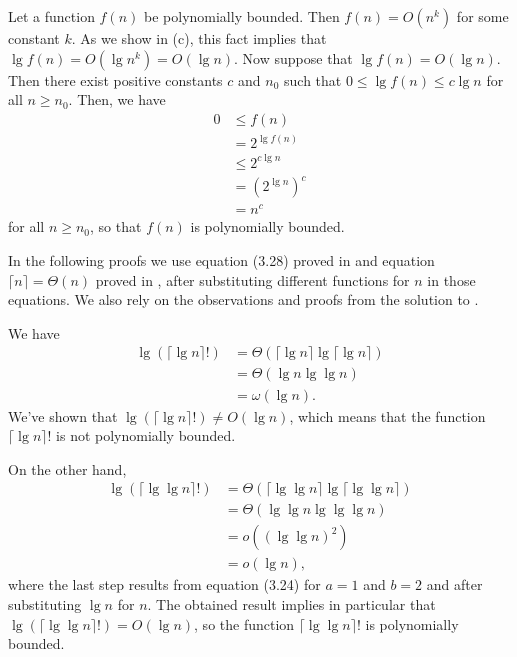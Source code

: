 Let a function $f(n)$ be polynomially bounded.
Then $f(n)=O(n^k)$ for some constant $k$.
As we show in (c), this fact implies that $\lg f(n)=O(\lg n^k)=O(\lg n)$.
Now suppose that $\lg f(n)=O(\lg n)$.
Then there exist positive constants $c$ and $n_0$ such that $0\le\lg f(n)\le c\lg n$ for all $n\ge n_0$.
Then, we have
\begin{align*}
    0 &\le f(n) \\
    &= 2^{\lg f(n)} \\
    &\le 2^{c\lg n} \\
    &= (2^{\lg n})^c \\
    &= n^c
\end{align*}
for all $n\ge n_0$, so that $f(n)$ is polynomially bounded.

In the following proofs we use equation (3.28) proved in  and equation $\lceil n\rceil=\Theta(n)$ proved in , after substituting different functions for $n$ in those equations.
We also rely on the observations and proofs from the solution to .

We have
\begin{align*}
    \lg(\lceil\lg n\rceil!) &= \Theta(\lceil\lg n\rceil\lg\lceil\lg n\rceil) \\
    &= \Theta(\lg n\lg\lg n) \\
    &= \omega(\lg n).
\end{align*}
We've shown that $\lg(\lceil\lg n\rceil!)\ne O(\lg n)$, which means that the function $\lceil\lg n\rceil!$ is not polynomially bounded.

On the other hand,
\begin{align*}
    \lg(\lceil\lg\lg n\rceil!) &= \Theta(\lceil\lg\lg n\rceil\lg\lceil\lg\lg n\rceil) \\
    &= \Theta(\lg\lg n\lg\lg\lg n) \\
    &= o((\lg\lg n)^2) \\
    &= o(\lg n),
\end{align*}
where the last step results from equation (3.24) for $a=1$ and $b=2$ and after substituting $\lg n$ for $n$.
The obtained result implies in particular that $\lg(\lceil\lg\lg n\rceil!)=O(\lg n)$, so the function $\lceil\lg\lg n\rceil!$ is polynomially bounded.
